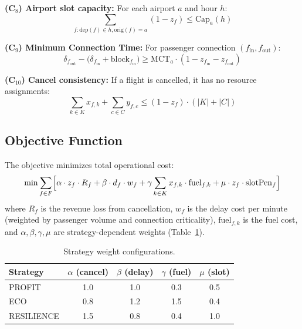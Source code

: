 \documentclass[12pt,number]{elsarticle}
\begin{document}
\textbf{(C$_8$) Airport slot capacity:} For each airport $a$ and hour $h$:
\begin{equation}
\sum_{f: \mathrm{dep}(f) \in h, \mathrm{orig}(f)=a} (1 - z_f) \leq \mathrm{Cap}_a(h)
\label{eq:c8}
\end{equation}

\textbf{(C$_9$) Minimum Connection Time:} For passenger connection $(f_{\mathrm{in}}, f_{\mathrm{out}})$:
\begin{equation}
\delta_{f_{\mathrm{out}}} - \bigl(\delta_{f_{\mathrm{in}}} + \mathrm{block}_{f_{\mathrm{in}}}\bigr) \geq \mathrm{MCT}_a \cdot (1 - z_{f_{\mathrm{in}}} - z_{f_{\mathrm{out}}})
\label{eq:c9}
\end{equation}

\textbf{(C$_{10}$) Cancel consistency:} If a flight is cancelled, it has no resource assignments:
\begin{equation}
\sum_{k \in K} x_{f,k} + \sum_{c \in C} y_{f,c} \leq (1 - z_f) \cdot (|K| + |C|)
\label{eq:c10}
\end{equation}

\subsection{Objective Function}

The objective minimizes total operational cost:
\begin{equation}
\min \sum_{f \in F} \Bigl[ \alpha \cdot z_f \cdot R_f + \beta \cdot d_f \cdot w_f + \gamma \sum_{k \in K} x_{f,k} \cdot \mathrm{fuel}_{f,k} + \mu \cdot z_f \cdot \mathrm{slotPen}_f \Bigr]
\label{eq:obj}
\end{equation}
where $R_f$ is the revenue loss from cancellation, $w_f$ is the delay cost per minute (weighted by passenger volume and connection criticality), $\mathrm{fuel}_{f,k}$ is the fuel cost, and $\alpha, \beta, \gamma, \mu$ are strategy-dependent weights (Table~\ref{tab:weights}).

\begin{table}[H]
\centering
\small
\caption{Strategy weight configurations.}
\label{tab:weights}
\begin{tabular}{@{}lcccc@{}}
\toprule
\textbf{Strategy} & $\alpha$ (cancel) & $\beta$ (delay) & $\gamma$ (fuel) & $\mu$ (slot) \\
\midrule
PROFIT & 1.0 & 1.0 & 0.3 & 0.5 \\
ECO & 0.8 & 1.2 & 1.5 & 0.4 \\
RESILIENCE & 1.5 & 0.8 & 0.4 & 1.0 \\
\bottomrule
\end{tabular}
\end{table}
\end{document}
